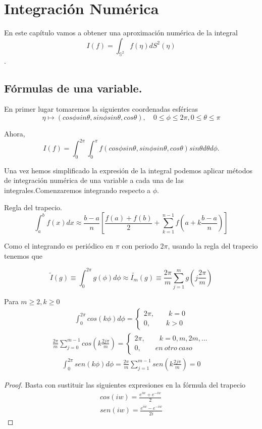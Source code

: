 \chapter[Integración Numérica]{Integración Numérica}
En este capítulo vamos a obtener una aproximación numérica de la integral $$ I(f) = \int_{\mathds{S}^2} f(\eta) dS^2(\eta) $$. 
\section{Fórmulas de una variable.}
En primer lugar tomaremos la siguientes coordenadas esféricas
$$ \eta \mapsto (cos\phi sin\theta, sin\phi sin\theta,cos \theta), \quad 0\le \phi \le 2\pi, 0\le \theta \le \pi$$
 
Ahora, 
$$
I(f) = \int_{0}^{2\pi} \int_{0}^{\pi} f(cos\phi sin\theta, sin\phi sin\theta,cos \theta)sin\theta d\theta d\phi. 
$$

Una vez hemos simplificado la expresión de la integral podemos aplicar métodos de integración numérica de una variable a cada una de las integrales.Comenzaremos integrando respecto a $\phi$.
\medskip
\begin{rem}Regla del trapecio.
	$$\int_{a}^{b} f(x)dx \approx \frac{b-a}{n}\left[\frac{f(a)+f(b)}{2}+\sum_{k=1}^{n-1}f(a+k\frac{b-a}{n})\right]
	$$
\end{rem}

Como el integrando es periódico en $\pi$ con periodo $2\pi$, usando la regla del trapecio tenemos que

$$
\widetilde{I}(g)\equiv \int_{0}^{2\pi} g(\phi)d\phi \approx \widetilde{I_m}(g) \equiv \frac{2\pi}{m} \sum_{j=1}^{m} g(j\frac{2\pi}{m})
$$

\begin{lem} Para $m\ge 2,k\ge 0$
	\begin{gather}
	\int_{0}^{2\pi} cos(k\phi)d\phi = \left\{\begin{array}{ll} 2\pi, \qquad k=0 
											\\ 0 ,  \qquad\  k>0
		\end{array} 
		\right.
	\end{gather}
	\begin{gather}
	\frac{2\pi}{m}\sum_{j=0}^{m-1}cos(k\frac{2j\pi}{m}) = \left\{\begin{array}{ll} 2\pi, \qquad k=0,m,2m,... 
	\\ 0 ,  \qquad en\ otro\ caso
	\end{array} 
	\right.
	\end{gather}
	\begin{gather}
	\int_{0}^{2\pi} sen(k\phi)d\phi =  \frac{2\pi}{m}\sum_{j=1}^{m-1}sen(k\frac{2j\pi}{m}) =0 
	\end{gather}
\end{lem}
\begin{proof}
Basta con sustituir las siguientes expresiones en la fórmula del trapecio
\begin{gather*}
cos(iw) = \frac{e^{iw}+e^{-iw}}{2} \\
sen(iw) = \frac{e^{iw}-e^{-iw}}{2i}
\end{gather*} 
\end{proof}

